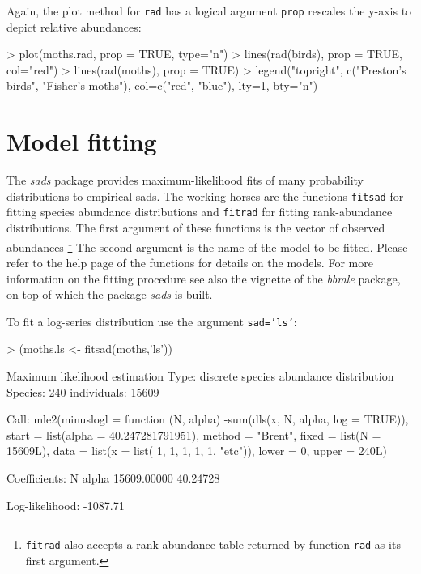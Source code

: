 \documentclass[11pt, A4]{article}
\newcommand{\code}[1]{\texttt{#1}}
\begin{document}
Again, the plot method for \code{rad}  has a logical argument \code{prop} 
rescales the y-axis to depict relative abundances:

\begin{Schunk}
\begin{Sinput}
> plot(moths.rad, prop = TRUE, type="n")
> lines(rad(birds), prop = TRUE, col="red")
> lines(rad(moths), prop = TRUE)
> legend("topright", c("Preston's birds", "Fisher's moths"), col=c("red", "blue"), lty=1, bty="n")
\end{Sinput}
\end{Schunk}

\section{Model fitting}
\label{sec:ajuste-e-selecao}
The \emph{sads} package provides maximum-likelihood fits of many
probability distributions to empirical sads. The working horses are the
functions \code{fitsad} for fitting species abundance distributions
and \code{fitrad} for fitting rank-abundance distributions. The first
argument of these functions is the vector of observed abundances 
\footnote{\code{fitrad} also accepts a rank-abundance table returned by function \code{rad} as its first argument.} 
The second argument is the name of the model to be fitted.
Please refer to the help
page of the functions for details on the models. For more information
on the fitting procedure see also the vignette of
the \emph{bbmle} package, on top of which the package \emph{sads} is built.

To fit a log-series distribution use the argument \code{sad='ls'}:

\begin{Schunk}
\begin{Sinput}
> (moths.ls <- fitsad(moths,'ls'))
\end{Sinput}
\begin{Soutput}
Maximum likelihood estimation
Type: discrete  species abundance distribution
Species: 240 individuals: 15609 

Call:
mle2(minuslogl = function (N, alpha) 
-sum(dls(x, N, alpha, log = TRUE)), start = list(alpha = 40.247281791951), 
    method = "Brent", fixed = list(N = 15609L), data = list(x = list(
        1, 1, 1, 1, 1, "etc")), lower = 0, upper = 240L)

Coefficients:
          N       alpha 
15609.00000    40.24728 

Log-likelihood: -1087.71 
\end{Soutput}
\end{Schunk}
\end{document}
